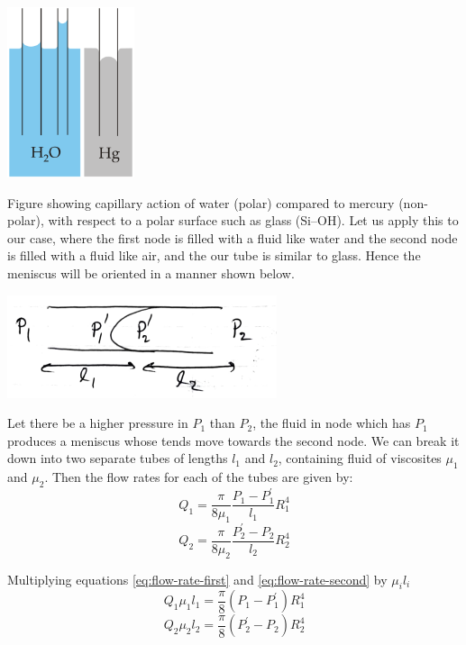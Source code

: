 	\includegraphics[height=5cm]{diagram/fig_capact-of-water} \label{fig_capact-of-water}

	Figure showing capillary action of water (polar) compared to mercury (non-polar), with respect to a polar surface such as glass (Si–OH). Let us apply this to our case, where the first node is filled with a fluid like water and the second node is filled with a fluid like air, and the our tube is similar to glass. Hence the meniscus will be oriented in a manner shown below.

	\includegraphics{diagram/fig_flowr-1-men}

	Let there be a higher pressure in $P_{1}$ than $P_{2}$, the fluid in node which has $P_{1}$ produces a meniscus whose tends move towards the second node. We can break it down into two separate tubes of lengths $l_{1}$ and $l_{2}$, containing fluid of viscosites ${\mu}_1$ and ${\mu}_2$. Then the flow rates for each of the tubes are given by:
	\begin{equation} \label{eq:flow-rate-first}
	Q_1 = \frac{\pi}{8{\mu}_1} \frac{P_1 - P^{'}_1}{l_1} R_1^4
	\end{equation}
	\begin{equation} \label{eq:flow-rate-second}
	Q_2 = \frac{\pi}{8{\mu}_2} \frac{P^{'}_2 - P_2}{l_2} R_2^4
	\end{equation}

	Multiplying equations \ref{eq:flow-rate-first} and \ref{eq:flow-rate-second} by ${\mu}_i l_i$
	\begin{equation} \label{eq:flow-rate-first-coeff}
	Q_1 {\mu}_1 l_1 = \frac{\pi}{8} (P_1 - P^{'}_1) R_1^4
	\end{equation}
	\begin{equation} \label{eq:flow-rate-second-coeff}
	Q_2 {\mu}_2 l_2 = \frac{\pi}{8} (P^{'}_2 - P_2) R_2^4
	\end{equation}

